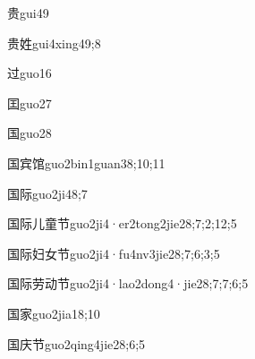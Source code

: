 \begin{verbete}{贵}{gui4}{9}
\end{verbete}

\begin{verbete}{贵姓}{gui4xing4}{9;8}
\end{verbete}

\begin{verbete}{过}{guo1}{6}
\end{verbete}

\begin{verbete}{囯}{guo2}{7}
\end{verbete}

\begin{verbete}{国}{guo2}{8}
\end{verbete}

\begin{verbete}{国宾馆}{guo2bin1guan3}{8;10;11}
\end{verbete}

\begin{verbete}{国际}{guo2ji4}{8;7}
\end{verbete}

\begin{verbete}{国际儿童节}{guo2ji4·er2tong2jie2}{8;7;2;12;5}
\end{verbete}

\begin{verbete}{国际妇女节}{guo2ji4·fu4nv3jie2}{8;7;6;3;5}
\end{verbete}

\begin{verbete}{国际劳动节}{guo2ji4·lao2dong4·jie2}{8;7;7;6;5}
\end{verbete}

\begin{verbete}{国家}{guo2jia1}{8;10}
\end{verbete}

\begin{verbete}{国庆节}{guo2qing4jie2}{8;6;5}
\end{verbete}

